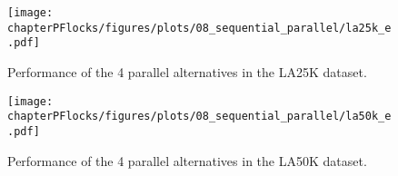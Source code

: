 \begin{figure}
    \centering
    \texttt{[image: chapterPFlocks/figures/plots/08\_sequential\_parallel/la25k\_e.pdf]}
    \caption{Performance of the 4 parallel alternatives in the LA25K dataset.}\label{fig:la25k_e}
\end{figure}

\begin{figure}
    \centering
    \texttt{[image: chapterPFlocks/figures/plots/08\_sequential\_parallel/la50k\_e.pdf]}
    \caption{Performance of the 4 parallel alternatives in the LA50K dataset.}\label{fig:la50k_e}
\end{figure}
